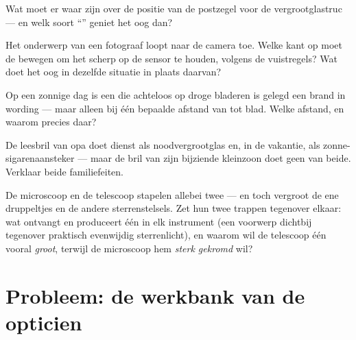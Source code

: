 \begin{exercise}[$\star$]\label{exo:g8:lenses-images:8}
Wat moet er waar zijn over de positie van de postzegel voor de
vergrootglastruc --- en welk soort ``'' geniet het oog dan?
\end{exercise}

\begin{exercise}[$\star\star$]\label{exo:g8:lenses-images:9}
Het onderwerp van een fotograaf loopt naar de camera toe. Welke kant op
moet de  bewegen om het  scherp op de
sensor te houden, volgens de vuistregels? Wat doet het oog in dezelfde
situatie in plaats daarvan?
\end{exercise}

\begin{exercise}[$\star\star$]\label{exo:g8:lenses-images:10}
Op een zonnige dag is een  die achteloos op droge bladeren
is gelegd een brand in wording --- maar alleen bij één bepaalde afstand
van  tot blad. Welke afstand, en waarom precies daar?
\end{exercise}

\begin{exercise}[$\star\star$]\label{exo:g8:lenses-images:11}
De leesbril van opa doet dienst als noodvergrootglas en, in de vakantie,
als zonne-sigarenaansteker --- maar de bril van zijn bijziende kleinzoon
doet geen van beide. Verklaar beide familiefeiten.
\end{exercise}

\begin{exercise}[$\star\star\star$]\label{exo:g8:lenses-images:12}
De microscoop en de telescoop stapelen allebei twee
 --- en toch vergroot de ene druppeltjes
en de andere sterrenstelsels. Zet hun twee trappen tegenover elkaar:
wat ontvangt en produceert  één in elk instrument (een
voorwerp dichtbij tegenover praktisch evenwijdig sterrenlicht), en
waarom wil de telescoop  één vooral \emph{groot}, terwijl de
microscoop hem \emph{sterk gekromd} wil?
\end{exercise}

\section{Probleem: de werkbank van de opticien}

